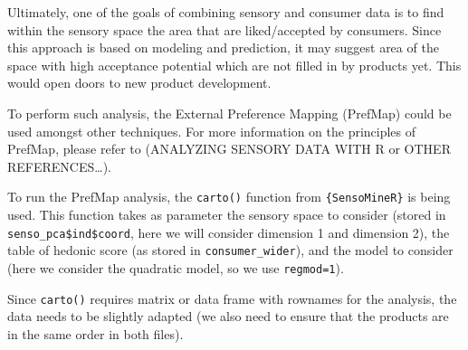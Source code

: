 \documentclass[
]{book}
\newenvironment{Shaded}{\begin{snugshade}}{\end{snugshade}}
\newcommand{\AttributeTok}[1]{\textcolor[rgb]{0.77,0.63,0.00}{#1}}
\newcommand{\ConstantTok}[1]{\textcolor[rgb]{0.00,0.00,0.00}{#1}}
\newcommand{\DecValTok}[1]{\textcolor[rgb]{0.00,0.00,0.81}{#1}}
\newcommand{\FunctionTok}[1]{\textcolor[rgb]{0.00,0.00,0.00}{#1}}
\newcommand{\NormalTok}[1]{#1}
\newcommand{\OtherTok}[1]{\textcolor[rgb]{0.56,0.35,0.01}{#1}}
\newcommand{\SpecialCharTok}[1]{\textcolor[rgb]{0.00,0.00,0.00}{#1}}
\newcommand{\StringTok}[1]{\textcolor[rgb]{0.31,0.60,0.02}{#1}}
\begin{document}
Ultimately, one of the goals of combining sensory and consumer data is to find within the sensory space the area that are liked/accepted by consumers. Since this approach is based on modeling and prediction, it may suggest area of the space with high acceptance potential which are not filled in by products yet. This would open doors to new product development.

To perform such analysis, the External Preference Mapping (PrefMap) could be used amongst other techniques. For more information on the principles of PrefMap, please refer to (ANALYZING SENSORY DATA WITH R or OTHER REFERENCES\ldots).

To run the PrefMap analysis, the \texttt{carto()} function from \texttt{\{SensoMineR\}} is being used. This function takes as parameter the sensory space to consider (stored in \texttt{senso\_pca\$ind\$coord}, here we will consider dimension 1 and dimension 2), the table of hedonic score (as stored in \texttt{consumer\_wider}), and the model to consider (here we consider the quadratic model, so we use \texttt{regmod=1}).

Since \texttt{carto()} requires matrix or data frame with rownames for the analysis, the data needs to be slightly adapted (we also need to ensure that the products are in the same order in both files).

\begin{Shaded}
\end{Shaded}
\end{document}
